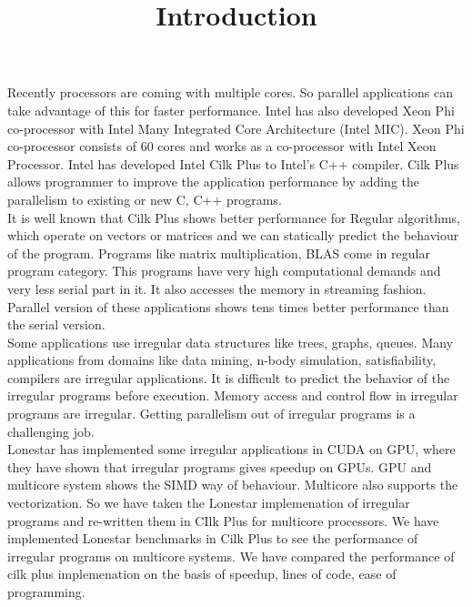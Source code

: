 \documentclass{article}
\begin{document}
\title{Introduction}
\date{}
\maketitle


Recently processors are coming with multiple cores. So parallel applications can take advantage of this for faster performance. Intel has also developed Xeon Phi co-processor with Intel Many Integrated Core Architecture (Intel MIC). Xeon Phi co-processor consists of 60 cores and works as a co-processor with Intel Xeon Processor. Intel has developed Intel Cilk Plus to Intel's C++ compiler. Cilk Plus allows programmer to improve the application performance by adding the parallelism to existing or new C, C++ programs. \\

It is well known that Cilk Plus shows better performance for Regular algorithms, which operate on vectors or matrices and we can statically predict the behaviour of the program. Programs like matrix multiplication, BLAS come in regular program category. This programs have very high computational demands and very less serial part in it. It also accesses the memory in streaming fashion. Parallel version of these applications shows tens times better performance than the serial version. \\

Some applications use irregular data structures like trees, graphs, queues. Many applications from domains like data mining, n-body simulation, satisfiability, compilers are irregular applications. It is difficult to predict the behavior of the irregular programs before execution. Memory access and control flow in irregular programs are irregular. Getting parallelism out of irregular programs is a challenging job. \\

Lonestar has implemented some irregular applications in CUDA on GPU, where they have shown that irregular programs gives speedup on GPUs. GPU and multicore system shows the SIMD way of behaviour. Multicore also supports the vectorization. So we have taken the Lonestar implemenation of irregular programs and re-written them in CIlk Plus for multicore processors. We have implemented Lonestar benchmarks in Cilk Plus to see the performance of irregular programs on multicore systems. We have compared the performance of cilk plus implemenation on the basis of speedup, lines of code, ease of programming.
\end{document}
